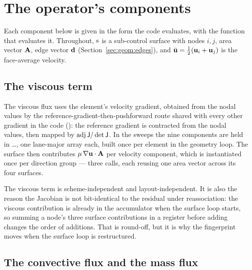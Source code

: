 \section{The operator's components}
\label{sec:components}

Each component below is given in the form the code evaluates, with the function that evaluates it.
Throughout, $\mathrm{s}$ is a sub-control surface with nodes $i,j$, area vector $\mathbf{A}$, edge vector
$\mathbf{d}$ (Section~\ref{sec:geom:edges}), and $\bar{\mathbf{u}} = \tfrac12(\mathbf{u}_i + \mathbf{u}_j)$ is the
face-average velocity.

\subsection{The viscous term}

The viscous flux uses the element's velocity gradient, obtained from the nodal values by the
reference-gradient-then-pushforward route shared with every other gradient in the code
(): the reference gradient is contracted from the nodal values, then
mapped by $\operatorname{adj}\mathsf{J}/\det\mathsf{J}$. In the sweeps the nine components are held in
\dots{}, one lane-major array each, built once per element in the geometry
loop. The surface then contributes $\mu\,\nabla\mathbf{u}\cdot\mathbf{A}$ per velocity component, which is
 instantiated once per direction group --- three calls, each
reusing one area vector across its four surfaces.

The viscous term is scheme-independent and layout-independent. It is also the reason the Jacobian
is not bit-identical to the residual under reassociation: the viscous contribution is already in
the accumulator when the surface loop starts, so summing a node's three surface contributions in a
register before adding changes the order of additions. That is round-off, but it is why the
fingerprint moves when the surface loop is restructured.

\subsection{The convective flux and the mass flux}

